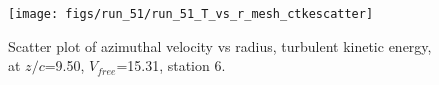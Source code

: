 \begin{figure}[H]
\centering
\texttt{[image: figs/run\_51/run\_51\_T\_vs\_r\_mesh\_ctkescatter]}
\caption{Scatter plot of azimuthal velocity vs radius, turbulent kinetic energy, at $z/c$=9.50, $V_{free}$=15.31, station 6.}
\label{fig:run_51_T_vs_r_mesh_ctkescatter}
\end{figure}


